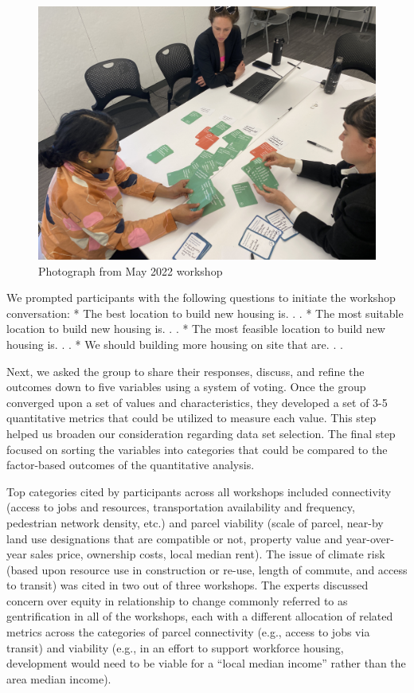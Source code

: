 \documentclass[
]{book}
\begin{document}
\begin{figure}
\includegraphics[width=1\linewidth]{04_figures/fig_3a} \caption{Photograph from May 2022 workshop}\label{fig:fig3a}
\end{figure}

We prompted participants with the following questions to initiate
the workshop conversation:
* The best location to build new housing is. . .
* The most suitable location to build new housing is. . .
* The most feasible location to build new housing is. . .
* We should building more housing on site that are. . .

Next, we asked the group to share their responses, discuss, and
refine the outcomes down to five variables using a system of voting.
Once the group converged upon a set of values and characteristics,
they developed a set of 3-5 quantitative metrics that could be
utilized to measure each value. This step helped us broaden our
consideration regarding data set selection. The final step focused
on sorting the variables into categories that could be compared to the factor-based outcomes of the quantitative analysis.

Top categories cited by participants across all workshops included connectivity (access to jobs and resources, transportation availability and frequency, pedestrian network density, etc.) and parcel viability (scale of parcel, near-by land use designations that are compatible or not, property value and year-over-year sales price, ownership costs, local median rent). The issue of climate risk (based upon resource use in construction or re-use, length of commute, and access to transit) was cited in two out of three workshops. The experts discussed concern over equity in relationship to change commonly referred to as gentrification in all of the workshops, each with a different allocation of related metrics across the categories of parcel connectivity (e.g., access to jobs via transit) and viability (e.g., in an effort to support workforce housing, development would need to be viable for a ``local median income'' rather than the area median income).
\end{document}
